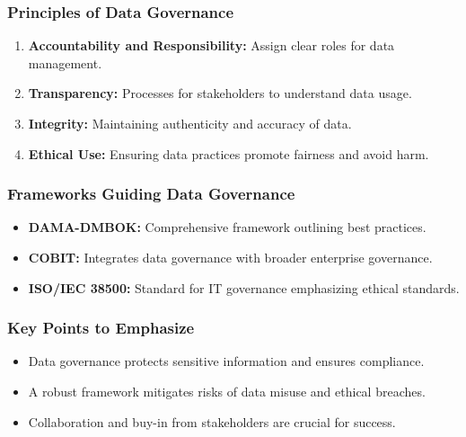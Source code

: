 \documentclass[aspectratio=169]{beamer}
\begin{document}
\begin{frame}[fragile]
    \frametitle{Principles of Data Governance}
    \begin{enumerate}
        \item \textbf{Accountability and Responsibility:} Assign clear roles for data management.
        \item \textbf{Transparency:} Processes for stakeholders to understand data usage.
        \item \textbf{Integrity:} Maintaining authenticity and accuracy of data.
        \item \textbf{Ethical Use:} Ensuring data practices promote fairness and avoid harm.
    \end{enumerate}
\end{frame}

\begin{frame}[fragile]
    \frametitle{Frameworks Guiding Data Governance}
    \begin{itemize}
        \item \textbf{DAMA-DMBOK:} Comprehensive framework outlining best practices.
        \item \textbf{COBIT:} Integrates data governance with broader enterprise governance.
        \item \textbf{ISO/IEC 38500:} Standard for IT governance emphasizing ethical standards.
    \end{itemize}
\end{frame}

\begin{frame}[fragile]
    \frametitle{Key Points to Emphasize}
    \begin{itemize}
        \item Data governance protects sensitive information and ensures compliance.
        \item A robust framework mitigates risks of data misuse and ethical breaches.
        \item Collaboration and buy-in from stakeholders are crucial for success.
    \end{itemize}
\end{frame}
\end{document}
